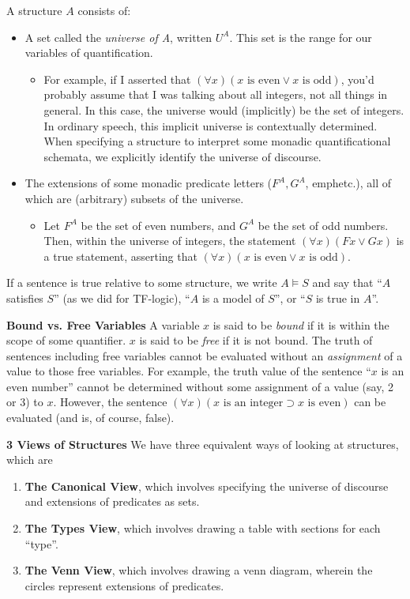 \begin{mdframed}[linewidth=1]
A structure $A$ consists of:
\begin{itemize}
    \item A set called the \emph{universe of A}, written $U^A$. This set is the range for our variables of quantification. 
    \begin{itemize}
        \item For example, if I asserted that $(\forall x)(x \text{ is even} \vee x \text{ is odd})$, you'd probably assume that I was talking about all integers, not all things in general. In this case, the universe would (implicitly) be the set of integers. In ordinary speech, this implicit universe is contextually determined. When specifying a structure to interpret some monadic quantificational schemata, we explicitly identify the universe of discourse.
            \end{itemize}
    \item The extensions of some monadic predicate letters ($F^A, G^A$, emph{etc}.), all of which are (arbitrary) subsets of the universe. 
    \begin{itemize}
        \item Let $F^A$ be the set of even numbers, and $G^A$ be the set  of odd numbers. Then, within the universe of integers, the statement $(\forall x)(Fx \vee Gx)$ is a true statement, asserting that $(\forall x)(x \text{ is even} \vee x \text{ is odd})$.
    \end{itemize}
\end{itemize}
If a sentence is true relative to some structure, we write $A \models S$ and say that ``$A$ satisfies $S$'' (as we did for TF-logic), ``$A$ is a model of $S$'', or ``$S$ is true in $A$''.

\textbf{Bound vs. Free Variables}
A variable $x$ is said to be \emph{bound} if it is within the scope of some quantifier. $x$ is said to be \emph{free} if it is not bound. The truth of sentences including free variables cannot be evaluated without an \emph{assignment} of a value to those free variables. For example, the truth value of the sentence ``$x$ is an even number'' cannot be determined without some assignment of a value (say, 2 or 3) to $x$. However, the sentence $(\forall x)(x \text{ is an integer} \supset x \text{ is even})$ can be evaluated (and is, of course, false). 

\textbf{3 Views of Structures}
We have three equivalent ways of looking at structures, which are
\begin{enumerate}
    \item \textbf{The Canonical View}, which involves specifying the universe of discourse and extensions of predicates as sets. 
    \item \textbf{The Types View}, which involves drawing a table with sections for each ``type''.
    \item \textbf{The Venn View}, which involves drawing a venn diagram, wherein the circles represent extensions of predicates. 
\end{enumerate}



\end{mdframed}
